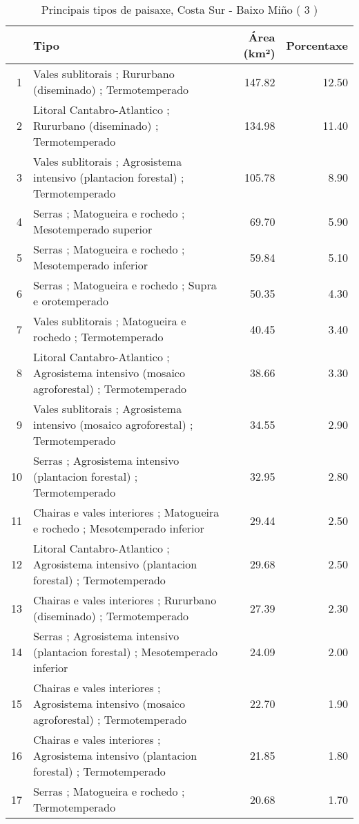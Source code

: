 \begin{table}[p]
\centering
\caption{Principais tipos de paisaxe,  Costa Sur - Baixo Miño ( 3 )} 
\label{Tipos 3}
\begin{tabular}{rlrr}
  \hline
 & Tipo & Área (km²) & Porcentaxe \\ 
  \hline
1 & Vales sublitorais ; Rururbano (diseminado) ; Termotemperado & 147.82 & 12.50 \\ 
  2 & Litoral Cantabro-Atlantico ; Rururbano (diseminado) ; Termotemperado & 134.98 & 11.40 \\ 
  3 & Vales sublitorais ; Agrosistema intensivo (plantacion forestal) ; Termotemperado & 105.78 & 8.90 \\ 
  4 & Serras ; Matogueira e rochedo ; Mesotemperado superior & 69.70 & 5.90 \\ 
  5 & Serras ; Matogueira e rochedo ; Mesotemperado inferior & 59.84 & 5.10 \\ 
  6 & Serras ; Matogueira e rochedo ; Supra e orotemperado & 50.35 & 4.30 \\ 
  7 & Vales sublitorais ; Matogueira e rochedo ; Termotemperado & 40.45 & 3.40 \\ 
  8 & Litoral Cantabro-Atlantico ; Agrosistema intensivo (mosaico agroforestal) ; Termotemperado & 38.66 & 3.30 \\ 
  9 & Vales sublitorais ; Agrosistema intensivo (mosaico agroforestal) ; Termotemperado & 34.55 & 2.90 \\ 
  10 & Serras ; Agrosistema intensivo (plantacion forestal) ; Termotemperado & 32.95 & 2.80 \\ 
  11 & Chairas e vales interiores ; Matogueira e rochedo ; Mesotemperado inferior & 29.44 & 2.50 \\ 
  12 & Litoral Cantabro-Atlantico ; Agrosistema intensivo (plantacion forestal) ; Termotemperado & 29.68 & 2.50 \\ 
  13 & Chairas e vales interiores ; Rururbano (diseminado) ; Termotemperado & 27.39 & 2.30 \\ 
  14 & Serras ; Agrosistema intensivo (plantacion forestal) ; Mesotemperado inferior & 24.09 & 2.00 \\ 
  15 & Chairas e vales interiores ; Agrosistema intensivo (mosaico agroforestal) ; Termotemperado & 22.70 & 1.90 \\ 
  16 & Chairas e vales interiores ; Agrosistema intensivo (plantacion forestal) ; Termotemperado & 21.85 & 1.80 \\ 
  17 & Serras ; Matogueira e rochedo ; Termotemperado & 20.68 & 1.70 \\ 

\end{tabular}
\end{table}
